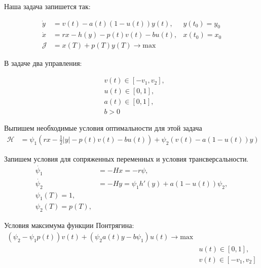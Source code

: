 Наша задача запишется так:

\begin{align}
    \Dot{y} & = v(t) - a(t)(1 - u(t)) y(t), & y(t_{0}) = y_{0} \\
    \Dot{x} & = r x - h(y) - p(t) v(t) - b u(t), & x(t_{0}) = x_{0} \\
    \mathcal{J} & = x(T) + p(T) y(T) \to \mathrm{max}
\end{align}

В задаче два управления:

\begin{align}
    & v(t) \in [-v_{1}, v_{2}], \\
    & u(t) \in [0, 1], \\
    & a(t) \in [0, 1],\\
    & b > 0
\end{align}

Выпишем необходимые условия оптимальности для этой задача\\
\begin{align}
    \mathcal{H} & = \psi_{1} (r x- \frac{1}{2}|y| - p(t) v(t) - b u(t)) + \psi_{2} (v(t) - a(1-u(t))y)
\end{align} 

Запишем условия для сопряженных переменных и условия трансверсальности.
\begin{align}
    \Dot{\psi_{1}} & = -H x = -r \psi,\\
    \Dot{\psi_{2}} & = -H y = \psi_{1} h'(y) + a(1-u(t))\psi_{2},\\
    {\psi_{1}(T)} = 1,\\
    {\psi_{2}(T)} = p(T),
\end{align} 

Условия максимума функции Понтрягина:\\
\begin{align}
     (\psi_{2} - \psi_{1} p(t)) v(t) + (\psi_{2} a(t) y - b \psi_{1})u(t)  \to \mathrm{max}\\
     & u(t) \in [0, 1],\\
     & v(t) \in [-v_{1}, v_{2}]
\end{align}



